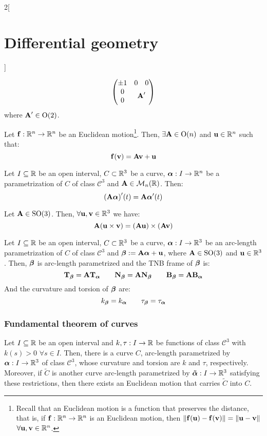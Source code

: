 \documentclass[../../../main_math.tex]{subfiles}
\begin{document}
\begin{multicols}{2}[\section{Differential geometry}]
\begin{proposition}
$$\begin{pmatrix}
        \pm 1 & 0                                              & 0 \\
        0     & \multicolumn{2}{c}{\multirow{2}{*}{$\vf{A}'$}}     \\
        0     &                                                &
      \end{pmatrix}$$
    where $\boldsymbol{\mathrm{A}}'\in\text{O}(2)$.
  \end{proposition}
  \begin{proposition}
    Let $\boldsymbol{\mathrm{f}}:\mathbb{R}^n\rightarrow\mathbb{R}^n$ be an Euclidean motion\footnote{Recall that an Euclidean motion is a function that preserves the distance, that is, if $\boldsymbol{\mathrm{f}}:\mathbb{R}^n\rightarrow\mathbb{R}^n$ is an Euclidean motion, then $\|\boldsymbol{\mathrm{f}}(\boldsymbol{\mathrm{u}})-\boldsymbol{\mathrm{f}}(\boldsymbol{\mathrm{v}})\|=\|\boldsymbol{\mathrm{u}}-\boldsymbol{\mathrm{v}}\|$ $\forall \boldsymbol{\mathrm{u}},\boldsymbol{\mathrm{v}}\in\mathbb{R}^n$.}. Then, $\exists\boldsymbol{\mathrm{A}}\in\text{O}(n)$ and $\boldsymbol{\mathrm{u}}\in\mathbb{R}^n$ such that: $$\boldsymbol{\mathrm{f}}(\boldsymbol{\mathrm{v}})=\boldsymbol{\mathrm{Av}}+\boldsymbol{\mathrm{u}}$$
  \end{proposition}
  \begin{proposition}
    Let $I\subseteq\mathbb{R}$ be an open interval, $C\subset\mathbb{R}^3$ be a curve, $\boldsymbol{\mathrm{\alpha}}:I\rightarrow\mathbb{R}^n$ be a parametrization of $C$ of class $\mathcal{C}^3$ and $\boldsymbol{\mathrm{A}}\in\mathcal{M}_n(\mathbb{R})$. Then:
    $${\left(\boldsymbol{\mathrm{A}}\boldsymbol{\mathrm{\alpha}}\right)}'(t)=\boldsymbol{\mathrm{A}}\boldsymbol{\mathrm{\alpha}}'(t)$$
  \end{proposition}
  \begin{proposition}
    Let $\boldsymbol{\mathrm{A}}\in\text{SO}(3)$. Then, $\forall \boldsymbol{\mathrm{u}},\boldsymbol{\mathrm{v}}\in\mathbb{R}^3$ we have: $$\boldsymbol{\mathrm{A}}(\boldsymbol{\mathrm{u}}\times\boldsymbol{\mathrm{v}})=\left(\boldsymbol{\mathrm{Au}}\right)\times\left(\boldsymbol{\mathrm{Av}}\right)$$
  \end{proposition}
  \begin{corollary}
    Let $I\subseteq\mathbb{R}$ be an open interval, $C\subset\mathbb{R}^3$ be a curve, $\boldsymbol{\mathrm{\alpha}}:I\rightarrow\mathbb{R}^3$ be an arc-length parametrization of $C$ of class $\mathcal{C}^3$ and $\boldsymbol{\mathrm{\beta}}:=\boldsymbol{\mathrm{A\alpha}}+\boldsymbol{\mathrm{u}}$, where $\boldsymbol{\mathrm{A}}\in\text{SO}(3)$ and $\boldsymbol{\mathrm{u}}\in\mathbb{R}^3$. Then, $\boldsymbol{\mathrm{\beta}}$ is arc-length parametrized and the TNB frame of $\boldsymbol{\mathrm{\beta}}$ is:
    $${\boldsymbol{\mathrm{T}}_{\boldsymbol{\mathrm{\beta}}}}=\boldsymbol{\mathrm{A}}{\boldsymbol{\mathrm{T}}_{\boldsymbol{\mathrm{\alpha}}}}\qquad{\boldsymbol{\mathrm{N}}_{\boldsymbol{\mathrm{\beta}}}}=\boldsymbol{\mathrm{A}}{\boldsymbol{\mathrm{N}}_{\boldsymbol{\mathrm{\beta}}}}\qquad{\boldsymbol{\mathrm{B}}_{\boldsymbol{\mathrm{\beta}}}}=\boldsymbol{\mathrm{A}}{\boldsymbol{\mathrm{B}}_{\boldsymbol{\mathrm{\alpha}}}}$$
    And the curvature and torsion of $\boldsymbol{\mathrm{\beta}}$ are: $$k_{\boldsymbol{\mathrm{\beta}}}=k_{\boldsymbol{\mathrm{\alpha}}}\qquad{\tau_{\boldsymbol{\mathrm{\beta}}}}={\tau_{\boldsymbol{\mathrm{\alpha}}}}$$
  \end{corollary}
  \subsubsection{Fundamental theorem of curves}
  \begin{theorem}
    Let $I\subseteq\mathbb{R}$ be an open interval and $k,\tau:I\rightarrow\mathbb{R}$ be functions of class $\mathcal{C}^3$ with $k(s)>0$ $\forall s\in I$. Then, there is a curve $C$, arc-length parametrized by $\boldsymbol{\mathrm{\alpha}}:I\rightarrow\mathbb{R}^3$ of class $\mathcal{C}^3$, whose curvature and torsion are $k$ and $\tau$, respectively. Moreover, if $\tilde{C}$ is another curve arc-length parametrized by $\boldsymbol{\mathrm{\tilde{\alpha}}}:I\rightarrow\mathbb{R}^3$ satisfying these restrictions, then there exists an Euclidean motion that carries $\tilde{C}$ into $C$.
  \end{theorem}

\end{multicols}
\end{document}

